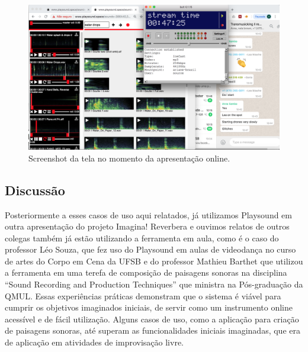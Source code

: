 \begin{figure}
\includegraphics[width=0.7\linewidth]{pictures/cap4/telasarc}
\caption{Screenshot da tela no momento da apresentação online.}
\label{telasarc}
\end{figure}


\subsection{Discussão}
Posteriormente a esses casos de uso aqui relatados, já utilizamos Playsound em outra apresentação do projeto Imagina! Reverbera e ouvimos relatos de outros colegas também já estão utilizando a ferramenta em aula, como é o caso do professor Léo Souza, que fez uso do Playsound em aulas de videodança no curso de artes do Corpo em Cena da UFSB e do professor Mathieu Barthet que utilizou a ferramenta em uma terefa de composição de paisagens sonoras na disciplina ``Sound Recording and Production Techniques'' que ministra na Pós-graduação da QMUL. Essas experiências práticas demonstram que o sistema é viável para cumprir os objetivos imaginados iniciais, de servir como um instrumento online acessível e de fácil utilização. Alguns casos de uso, como a aplicação para criação de paisagens sonoras, até superam as funcionalidades iniciais imaginadas, que era de aplicação em atividades de improvisação livre.


















